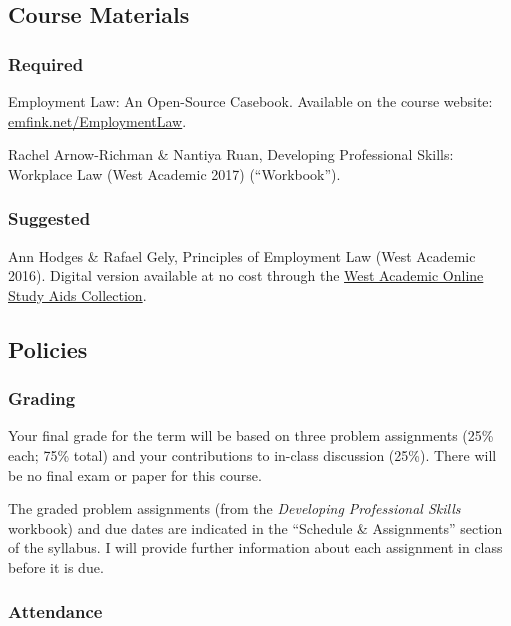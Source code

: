 \documentclass[11pt,letterpaper,twoside]{article}
\begin{document}
\subsection*{Course Materials}\label{course-materials}

\subsubsection{Required}\label{required}

Employment Law: An Open-Source Casebook. Available on the course
website:
\href{http://www.emfink.net/EmploymentLaw}{emfink.net/EmploymentLaw}.

Rachel Arnow-Richman \& Nantiya Ruan, Developing Professional Skills:
Workplace Law (West Academic 2017) (``Workbook'').

\subsubsection{Suggested}\label{suggested}

Ann Hodges \& Rafael Gely, Principles of Employment Law (West Academic
2016). Digital version available at no cost through the
\href{https://subscription.westacademic.com/}{West Academic Online Study
Aids Collection}.

\subsection*{Policies}\label{policies}

\subsubsection{Grading}\label{grading}

Your final grade for the term will be based on three problem assignments
(25\% each; 75\% total) and your contributions to in-class discussion
(25\%). There will be no final exam or paper for this course.

The graded problem assignments (from the \emph{Developing Professional
Skills} workbook) and due dates are indicated in the ``Schedule \&
Assignments'' section of the syllabus. I will provide further
information about each assignment in class before it is due.

\subsubsection{Attendance}\label{attendance}
\end{document}
